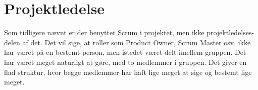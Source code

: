 \chapter{Projektledelse}
Som tidligere nævnt er der benyttet Scrum i projektet, men ikke projektledelses-delen af det. Det vil sige, at roller som Product Owner, Scrum Master osv. ikke har været på en bestemt person, men istedet været delt imellem gruppen. Det har været meget naturligt at gøre, med to medlemmer i gruppen. Det giver en flad struktur, hvor begge medlemmer har haft lige meget at sige og bestemt lige meget.  